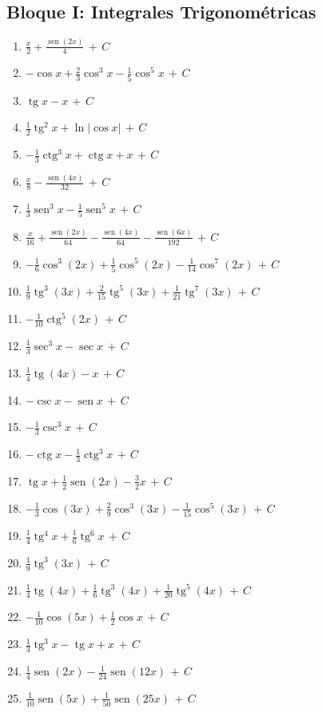 \documentclass[12pt, letterpaper]{article}
\newcommand{\CC}{\,+\,C}
\DeclareMathOperator{\sen}{sen}
\DeclareMathOperator{\tg}{tg}
\DeclareMathOperator{\ctg}{ctg}
\begin{document}
\subsection*{Bloque I: Integrales Trigonométricas}
\begin{enumerate}[leftmargin=*, label=\textbf{\arabic*.}]
  \item $\frac{x}{2} + \frac{\sen(2x)}{4} \CC$
  \item $-\cos x + \frac{2}{3}\cos^3 x - \frac{1}{5}\cos^5 x \CC$
  \item $\tg x - x \CC$
  \item $\frac{1}{2}\tg^2 x + \ln|\cos x| \CC$
  \item $-\frac{1}{3}\ctg^3 x + \ctg x + x \CC$
  \item $\frac{x}{8} - \frac{\sen(4x)}{32} \CC$
  \item $\frac{1}{3}\sen^3 x - \frac{1}{5}\sen^5 x \CC$
  \item $\frac{x}{16} + \frac{\sen(2x)}{64} - \frac{\sen(4x)}{64} - \frac{\sen(6x)}{192} \CC$
  \item $-\frac{1}{6}\cos^3(2x) + \frac{1}{5}\cos^5(2x) - \frac{1}{14}\cos^7(2x) \CC$
  \item $\frac{1}{9}\tg^3(3x) + \frac{2}{15}\tg^5(3x) + \frac{1}{21}\tg^7(3x) \CC$
  \item $-\frac{1}{10}\ctg^5(2x) \CC$
  \item $\frac{1}{3}\sec^3 x - \sec x \CC$
  \item $\frac{1}{4}\tg(4x) - x \CC$
  \item $-\csc x - \sen x \CC$
  \item $-\frac{1}{3}\csc^3 x \CC$
  \item $-\ctg x - \frac{1}{3}\ctg^3 x \CC$
  \item $\tg x + \frac{1}{2}\sen(2x) - \frac{3}{2}x \CC$
  \item $-\frac{1}{3}\cos(3x) + \frac{2}{9}\cos^3(3x) - \frac{1}{15}\cos^5(3x) \CC$
  \item $\frac{1}{4}\tg^4 x + \frac{1}{6}\tg^6 x \CC$
  \item $\frac{1}{9}\tg^3(3x) \CC$
  \item $\frac{1}{4}\tg(4x) + \frac{1}{6}\tg^3(4x) + \frac{1}{20}\tg^5(4x) \CC$
  \item $-\frac{1}{10}\cos(5x) + \frac{1}{2}\cos x \CC$
  \item $\frac{1}{3}\tg^3 x - \tg x + x \CC$
  \item $\frac{1}{4}\sen(2x) - \frac{1}{24}\sen(12x) \CC$
  \item $\frac{1}{10}\sen(5x) + \frac{1}{50}\sen(25x) \CC$

\end{enumerate}
\end{document}
